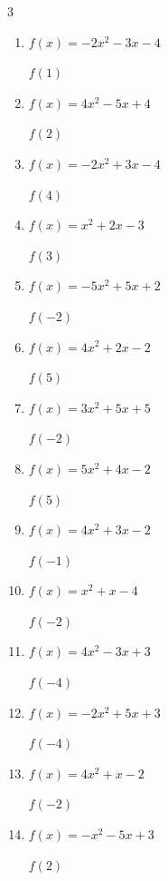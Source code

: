 \begin{multicols}{3}
\begin{enumerate}
  \item $f(x)=-2x^{2}-3x-4$

$f(1)$
        \phantom{$= -9$}

\columnbreak %

  \item $f(x)=4x^{2}-5x+4$

$f(2)$
        \phantom{$= 10$}

  \item $f(x)=-2x^{2}+3x-4$

$f(4)$
        \phantom{$= -24$}

  \item $f(x)=x^{2}+2x-3$

$f(3)$
        \phantom{$= 12$}

  \item $f(x)=-5x^{2}+5x+2$

$f(-2)$
        \phantom{$= -28$}

  \item $f(x)=4x^{2}+2x-2$

$f(5)$
        \phantom{$= 108$}

  \item $f(x)=3x^{2}+5x+5$

$f(-2)$
        \phantom{$= 7$}

  \item $f(x)=5x^{2}+4x-2$

$f(5)$
        \phantom{$= 143$}

  \item $f(x)=4x^{2}+3x-2$

$f(-1)$
        \phantom{$= -1$}

  \item $f(x)=x^{2}+x-4$

$f(-2)$
        \phantom{$= -2$}

  \item $f(x)=4x^{2}-3x+3$

$f(-4)$
        \phantom{$= 79$}

  \item $f(x)=-2x^{2}+5x+3$

$f(-4)$
        \phantom{$= -49$}

  \item $f(x)=4x^{2}+x-2$

$f(-2)$
        \phantom{$= 12$}

  \item $f(x)=-x^{2}-5x+3$

$f(2)$
        \phantom{$= -11$}


\end{enumerate}
\end{multicols}
